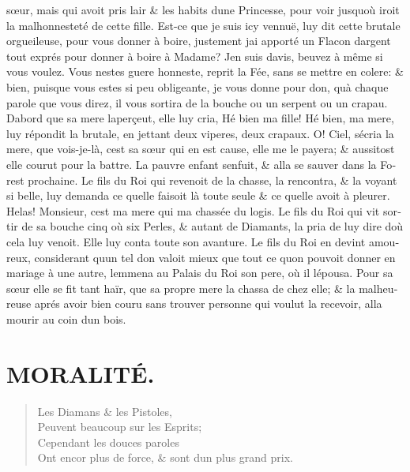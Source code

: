 \documentclass[14pt,a4paper]{memoir}
\begin{document}
\begin{otherlanguage}{french}
sœur, mais qui avoit pris l\textquotesingle air \& les habits
d\textquotesingle une Princesse, pour voir jusqu\textquotesingle où
iroit la malhonnesteté de cette fille. Est-ce que je suis icy vennuë,
luy dit cette brutale orgueileuse, pour vous donner à boire, justement
j\textquotesingle ai apporté un Flacon d\textquotesingle argent tout
exprés pour donner à boire à Madame? J\textquotesingle en suis
d\textquotesingle avis, beuvez à même si vous voulez. Vous
n\textquotesingle estes guere honneste, reprit la Fée, sans se mettre en
colere: \& bien, puisque vous estes si peu obligeante, je vous donne
pour don, qu\textquotesingle à chaque parole que vous direz, il vous
sortira de la bouche ou un serpent ou un crapau. D\textquotesingle abord
que sa mere l\textquotesingle aperçeut, elle luy cria, Hé bien ma fille!
Hé bien, ma mere, luy répondit la brutale, en jettant deux viperes, deux
crapaux. O! Ciel, s\textquotesingle écria la mere, que vois-je-là,
c\textquotesingle est sa sœur qui en est cause, elle me le payera; \&
aussitost elle courut pour la battre. La pauvre enfant
s\textquotesingle enfuit, \& alla se sauver dans la Forest prochaine. Le
fils du Roi qui revenoit de la chasse, la rencontra, \& la voyant si
belle, luy demanda ce qu\textquotesingle elle faisoit là toute seule \&
ce qu\textquotesingle elle avoit à pleurer. Helas! Monsieur,
c\textquotesingle est ma mere qui m\textquotesingle a chassée du logis.
Le fils du Roi qui vit sortir de sa bouche cinq où six Perles, \& autant
de Diamants, la pria de luy dire d\textquotesingle où cela luy venoit.
Elle luy conta toute son avanture. Le fils du Roi en devint amoureux,
considerant qu\textquotesingle un tel don valoit mieux que tout ce
qu\textquotesingle on pouvoit donner en mariage à une autre,
l\textquotesingle emmena au Palais du Roi son pere, où il
l\textquotesingle épousa. Pour sa sœur elle se fit tant haïr, que sa
propre mere la chassa de chez elle; \& la malheureuse aprés avoir bien
couru sans trouver personne qui voulut la recevoir, alla mourir au coin
d\textquotesingle un bois.

\section{MORALITÉ.}

\begin{verse}
  \small
Les Diamans \& les Pistoles, \\
Peuvent beaucoup sur les Esprits; \\
Cependant les douces paroles \\
Ont encor plus de force, \& sont d\textquotesingle un plus grand prix.


\end{verse}
\end{otherlanguage}
\end{document}
